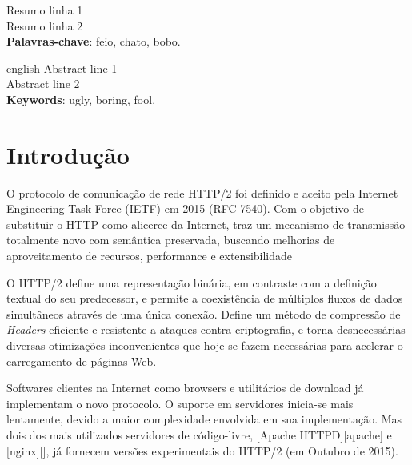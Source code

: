 \documentclass[12pt,a4paper,openright,twoside,english,brazil,]{abntex2}	%
\begin{document}
\imprimircapa	%
\imprimirfolhaderosto	%

\begin{resumo}
Resumo linha 1\\
Resumo linha 2   %
\\
\vspace{\onelineskip}
\noindent\textbf{Palavras-chave}: feio, chato, bobo.  %
\end{resumo}

\begin{resumo}[Abstract]
\begin{otherlanguage*}{english}
Abstract line 1\\
Abstract line 2   %
\\
\vspace{\onelineskip}
\noindent\textbf{Keywords}: ugly, boring, fool.  %
\end{otherlanguage*}
\end{resumo}

{
\hypersetup{linkcolor=black}
\setcounter{tocdepth}{3}
\noindent\tableofcontents* %
\cleardoublepage
}

\textual	%
\section{Introdução}\label{introduuxe7uxe3o}

O protocolo de comunicação de rede HTTP/2 foi definido e aceito pela
Internet Engineering Task Force (IETF) em 2015
(\href{https://tools.ietf.org/html/rfc7540}{RFC 7540}). Com o objetivo
de substituir o HTTP como alicerce da Internet, traz um mecanismo de
transmissão totalmente novo com semântica preservada, buscando melhorias
de aproveitamento de recursos, performance e extensibilidade

O HTTP/2 define uma representação binária, em contraste com a definição
textual do seu predecessor, e permite a coexistência de múltiplos fluxos
de dados simultâneos através de uma única conexão. Define um método de
compressão de \emph{Headers} eficiente e resistente a ataques contra
criptografia, e torna desnecessárias diversas otimizações inconvenientes
que hoje se fazem necessárias para acelerar o carregamento de páginas
Web.

Softwares clientes na Internet como browsers e utilitários de download
já implementam o novo protocolo. O suporte em servidores inicia-se mais
lentamente, devido a maior complexidade envolvida em sua implementação.
Mas dois dos mais utilizados servidores de código-livre, {[}Apache
HTTPD{]}{[}apache{]} e {[}nginx{]}{[}{]}, já fornecem versões
experimentais do HTTP/2 (em Outubro de 2015).
\end{document}
